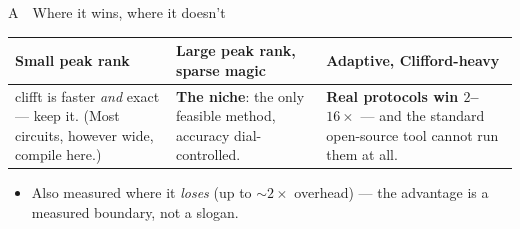 \documentclass[aspectratio=169,11pt]{beamer}
\begin{document}
\begin{frame}{A \,\textperiodcentered\, Where it wins, where it doesn't}
  \centering
  \small
  \begin{tabular}{@{}p{}p{}p{}@{}}
    \toprule
    \textbf{Small peak rank} & \textbf{Large peak rank, sparse magic} & \textbf{Adaptive, Clifford-heavy} \\
    \midrule
    clifft is faster \emph{and} exact --- keep it. (Most circuits, however wide, compile here.) &
    \textcolor{copper}{\textbf{The niche}}: the only feasible method, accuracy dial-controlled. &
    \textcolor{copper}{\textbf{Real protocols win $2$--$16\times$}} --- and the standard open-source tool cannot run them at all. \\
    \bottomrule
  \end{tabular}
  \vspace{0.8em}
  \begin{itemize}
    \item Also measured where it \emph{loses} (up to $\sim\!2\times$ overhead) --- the advantage is a measured boundary, not a slogan.
  \end{itemize}
\end{frame}
\end{document}
